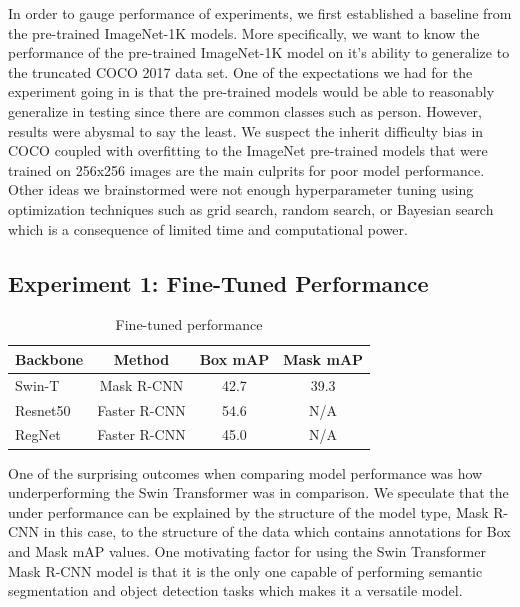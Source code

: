 \documentclass[10pt,twocolumn,letterpaper]{article}
\begin{document}
In order to gauge performance of experiments, we first established a baseline from the pre-trained ImageNet-1K models. More specifically, we want to know the performance of the pre-trained ImageNet-1K model on it's ability to generalize to the truncated COCO 2017 data set. One of the expectations we had for the experiment going in is that the pre-trained models would be able to reasonably generalize in testing since there are common classes such as person. However, results were abysmal to say the least. We suspect the inherit difficulty bias in COCO coupled with overfitting to the ImageNet pre-trained models that were trained on 256x256 images are the main culprits for poor model performance. Other ideas we brainstormed were not enough hyperparameter tuning using optimization techniques such as grid search, random search, or Bayesian search which is a consequence of limited time and computational power.

\subsection{Experiment 1: Fine-Tuned Performance}

\begin{table}[hbt!]
\begin{center}
\begin{tabular}{|l|c|c|c|}
\hline
Backbone & Method   & Box mAP & Mask mAP \\
\hline\hline
Swin-T   & Mask R-CNN & 42.7    & 39.3 \\
Resnet50   & Faster R-CNN & 54.6    & N/A \\
RegNet & Faster R-CNN & 45.0 & N/A \\
\hline
\end{tabular}
\end{center}
\caption{Fine-tuned performance}
\end{table}


One of the surprising outcomes when comparing model performance was how underperforming the Swin Transformer was in comparison. We speculate that the under performance can be explained by the structure of the model type, Mask R-CNN in this case, to the structure of the data which contains annotations for Box and Mask mAP values. One motivating factor for using the Swin Transformer Mask R-CNN model is that it is the only one capable of performing semantic segmentation and object detection tasks which makes it a versatile model.
\end{document}
